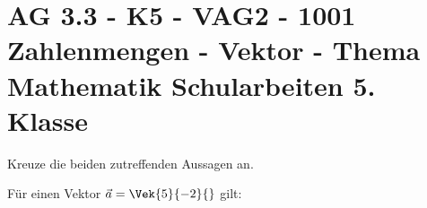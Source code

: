 \section{AG 3.3 - K5 - VAG2 - 1001 Zahlenmengen - Vektor - Thema Mathematik Schularbeiten 5. Klasse}

\begin{beispiel}[K5 - VAG2]{1} %
Kreuze die beiden zutreffenden Aussagen an.\leer

Für einen Vektor $\vec{a}=\Vek{5}{-2}{}$ gilt:

\end{beispiel}